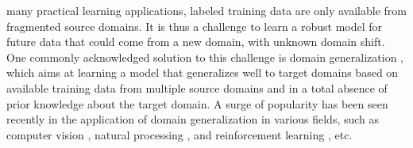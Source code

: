 \documentclass[journal]{IEEEtran}
\begin{document}
% 
% 
% 
% 
 many practical learning applications, labeled training data are only available from fragmented source domains. It is thus a challenge to learn a robust model for future data that could come from a new domain, with unknown domain shift. One commonly acknowledged solution to this challenge is domain generalization \cite{blanchard2011generalizing}, which aims at learning a model that generalizes well to target domains based on available training data from multiple source domains and in a total absence of prior knowledge about the target domain. A surge of popularity has been seen recently in the application of domain generalization in various fields, such as computer vision \cite{gong2019dlow,shi2020towards,zhou2020learning,zhou2021learning,yue2019domain,volpi2018generalizing,shao2019multi}, natural processing \cite{balaji2018metareg,marzinotto2019robust,stepanov2014towards,fried2019cross}, and reinforcement learning \cite{li2018learning}, etc.
\end{document}
